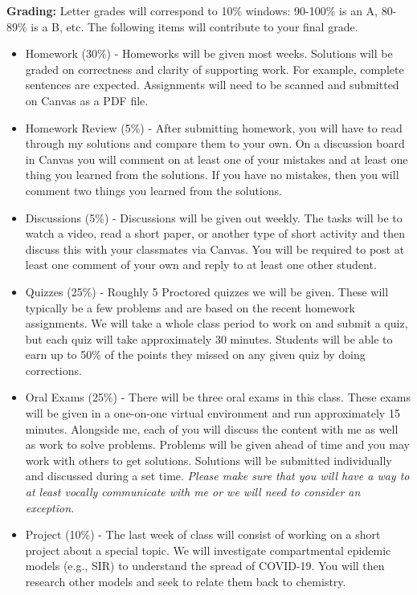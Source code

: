 \documentclass[12pt]{amsbook}
\begin{document}
\textbf{Grading:} Letter grades will correspond to 10\% windows: 90-100\% is an A, 80-89\% is a B, etc. The following items will contribute to your final grade.
\begin{itemize}
\item Homework (30\%) - Homeworks will be given most weeks. Solutions will be graded on correctness and clarity of supporting work. For example, complete sentences are expected. Assignments will need to be scanned and submitted on Canvas as a PDF file.
\item Homework Review (5\%) - After submitting homework, you will have to read through my solutions and compare them to your own. On a discussion board in Canvas you will comment on at least one of your mistakes and at least one thing you learned from the solutions. If you have no mistakes, then you will comment two things you learned from the solutions.
\item Discussions (5\%) - Discussions will be given out weekly. The tasks will be to watch a video, read a short paper, or another type of short activity and then discuss this with your classmates via Canvas. You will be required to post at least one comment of your own and reply to at least one other student.
\item Quizzes (25\%) -  Roughly 5 Proctored quizzes we will be given.  These will typically be a few problems and are based on the recent homework assignments. We will take a whole class period to work on and submit a quiz, but each quiz will take approximately 30 minutes. Students will be able to earn up to 50\% of the points they missed on any given quiz by doing corrections.
\item Oral Exams (25\%) - There will be three oral exams in this class. These exams will be given in a one-on-one virtual environment and run approximately 15 minutes.  Alongside me, each of you will discuss the content with me as well as work to solve problems. Problems will be given ahead of time and you may work with others to get solutions.  Solutions will be submitted individually and discussed during a set time. \emph{Please make sure that you will have a way to at least vocally communicate with me or we will need to consider an exception.}
\item Project (10\%) - The last week of class will consist of working on a short project about a special topic.  We will investigate compartmental epidemic models (e.g., SIR) to understand the spread of COVID-19.  You will then research other models and seek to relate them back to chemistry. 
\end{itemize}
\end{document}
